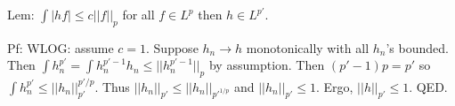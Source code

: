\documentclass{../uva7310}
\begin{document}
Lem: $\int |hf|\leq c||f||_p$ for all $f\in L^p$ then $h\in L^{p'}$.

Pf: WLOG: assume $c=1$. Suppose $h_n\to h$ monotonically with all $h_n$'s bounded. Then $\int h_n^{p'}=\int h_n^{p'-1}h_n\leq ||h_n^{p'-1}||_p$ by
assumption. Then $(p'-1)p=p'$ so $\int h_n^{p'}\leq ||h_n||_{p'}^{p'/p}$. Thus $||h_n||_{p'}\leq ||h_n||_{p'^{1/p}}$ and
$||h_n||_{p'}\leq 1$. Ergo, $||h||_{p'}\leq 1$. QED.
\end{document}
